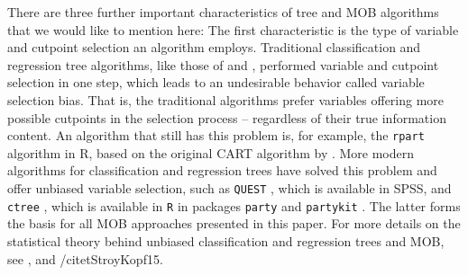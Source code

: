\documentclass[doc,floatsintext,natbib]{apa7}
\begin{document}




There are three further important characteristics of tree and MOB algorithms that we would like to mention here: The first characteristic is the type of variable and cutpoint selection an algorithm employs. Traditional classification and regression tree algorithms, like those of \citet{Breetal:1984} and \citet{Qui:1993}, performed variable and cutpoint selection in one step, which leads to an undesirable behavior called variable selection bias. That is, the traditional algorithms prefer variables offering more possible cutpoints in the selection process -- regardless of their true information content. An algorithm that still has this problem is, for example, the \texttt{rpart} algorithm in R, based on the original CART algorithm by \citet{Breetal:1984}. More modern algorithms for classification and regression trees have solved this problem and offer unbiased variable selection, such as \texttt{QUEST} \citep{LohShi:1997}, which is available in SPSS, and \texttt{ctree} \citep{Hotetal:2006}, which is available in \texttt{R} in packages \texttt{party} and \texttt{partykit} \citep{partykit:pkg}. The latter forms the basis for all MOB approaches presented in this paper. For more details on the statistical theory behind unbiased classification and regression trees and MOB, see \citet{Hotetal:2006}, \citet{StrMalTut:2009:PM} and /citet{StroyKopf15}.  
\end{document}
